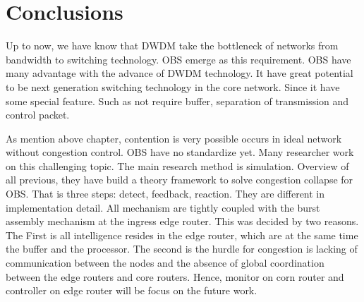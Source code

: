 \chapter{Conclusions}
\ifpdf
    \graphicspath{{Conclusions/ConclusionsFigs/PNG/}{Conclusions/ConclusionsFigs/PDF/}{Conclusions/ConclusionsFigs/}}
\else
    \graphicspath{{Conclusions/ConclusionsFigs/EPS/}{Conclusions/ConclusionsFigs/}}
\fi


Up to now, we have know that DWDM take the bottleneck of networks from bandwidth to switching technology. OBS emerge as this requirement. OBS have many advantage with the advance of DWDM technology. It have great potential to be next generation switching technology in the core network. Since it have some special feature. Such as not require buffer, separation of transmission and control packet. 

As mention above chapter, contention is very possible occurs in ideal network without congestion control. OBS have no standardize yet. Many researcher work on this challenging topic. The main research method is simulation. Overview of all previous, they have build a theory framework to solve congestion collapse for OBS. That is three steps: detect, feedback, reaction. They are different in implementation detail. All mechanism are tightly coupled with the burst assembly mechanism at the
ingress edge router. This was decided by two reasons. The First is all intelligence resides in the edge router, which are at the same time the buffer and the processor. The second is the hurdle for congestion is lacking of communication between the nodes and the absence of global coordination between the edge routers and core routers. Hence, monitor on corn router and controller on edge router will be focus on the future work. 





